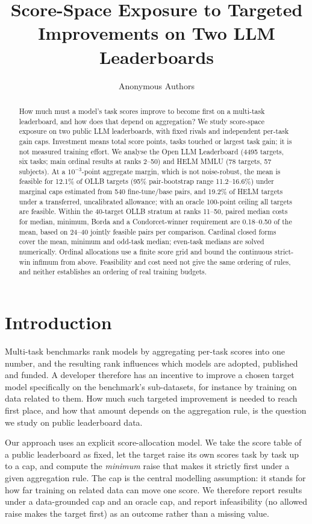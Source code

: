 \documentclass{article}
\title{Score-Space Exposure to Targeted Improvements on Two LLM Leaderboards}
\author{Anonymous Authors}
\begin{document}
\maketitle

\begin{abstract}
How much must a model's task scores improve to become first on a multi-task leaderboard, and how does that depend on aggregation? We study score-space exposure on two public LLM leaderboards, with fixed rivals and independent per-task gain caps. Investment means total score points, tasks touched or largest task gain; it is not measured training effort. We analyse the Open LLM Leaderboard (4495 targets, six tasks; main ordinal results at ranks 2--50) and HELM MMLU (78 targets, 57 subjects). At a $10^{-3}$-point aggregate margin, which is not noise-robust, the mean is feasible for 12.1\% of OLLB targets (95\% pair-bootstrap range 11.2--16.6\%) under marginal caps estimated from 540 fine-tune/base pairs, and 19.2\% of HELM targets under a transferred, uncalibrated allowance; with an oracle 100-point ceiling all targets are feasible. Within the 40-target OLLB stratum at ranks 11--50, paired median costs for median, minimum, Borda and a Condorcet-winner requirement are 0.18--0.50 of the mean, based on 24--40 jointly feasible pairs per comparison. Cardinal closed forms cover the mean, minimum and odd-task median; even-task medians are solved numerically. Ordinal allocations use a finite score grid and bound the continuous strict-win infimum from above. Feasibility and cost need not give the same ordering of rules, and neither establishes an ordering of real training budgets.
\end{abstract}

\section{Introduction}
\label{sec:intro}
Multi-task benchmarks rank models by aggregating per-task scores into one number, and the resulting rank influences which models are adopted, published and funded. A developer therefore has an incentive to improve a chosen target model specifically on the benchmark's sub-datasets, for instance by training on data related to them. How much such targeted improvement is needed to reach first place, and how that amount depends on the aggregation rule, is the question we study on public leaderboard data.

Our approach uses an explicit score-allocation model. We take the score table of a public leaderboard as fixed, let the target raise its own scores task by task up to a cap, and compute the \emph{minimum} raise that makes it strictly first under a given aggregation rule. The cap is the central modelling assumption: it stands for how far training on related data can move one score. We therefore report results under a data-grounded cap and an oracle cap, and report infeasibility (no allowed raise makes the target first) as an outcome rather than a missing value.
\end{document}
